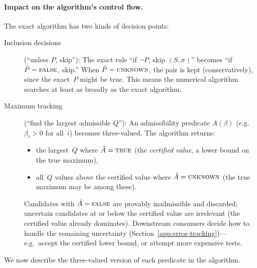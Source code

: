 \paragraph{Impact on the algorithm's control flow.}
The exact algorithm has two kinds of decision points:
\begin{description}
\item[Inclusion decisions] (``unless $P$, skip''):
  The exact rule ``if $\lnot P$, skip $(S, \sigma)$''
  becomes ``if $\tilde P = \textsc{false}$, skip.''
  When $\tilde P = \textsc{unknown}$, the pair is kept
  (conservatively), since the exact~$P$ might be true.
  This means the numerical algorithm searches at least as
  broadly as the exact algorithm.
\item[Maximum tracking] (``find the largest admissible $Q$''):
  An admissibility predicate $A(\beta)$ (e.g.\ $\beta_i > 0$
  for all~$i$) becomes three-valued.
  The algorithm returns:
  \begin{itemize}
  \item the largest~$Q$ where $\tilde A = \textsc{true}$
    (the \emph{certified value}, a lower bound on the
    true maximum),
  \item all~$Q$ values above the certified value where
    $\tilde A = \textsc{unknown}$
    (the true maximum may be among these).
  \end{itemize}
  Candidates with $\tilde A = \textsc{false}$ are provably
  inadmissible and discarded; uncertain candidates at or below
  the certified value are irrelevant (the certified value already
  dominates). Downstream consumers decide how to handle the
  remaining uncertainty (Section~\ref{app:error-tracking})---e.g.\
  accept the certified lower bound, or attempt more expensive tests.
\end{description}

We now describe the three-valued version of each predicate
in the algorithm.

